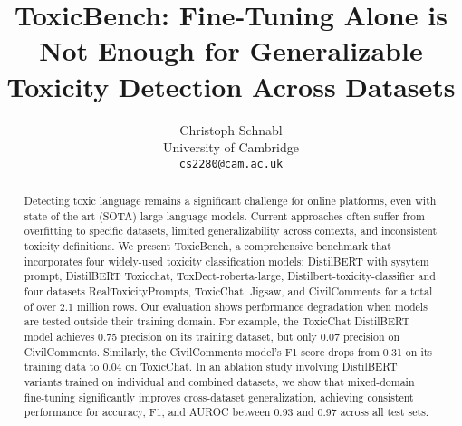 \documentclass{article}
\title{ToxicBench: Fine-Tuning Alone is Not Enough for Generalizable Toxicity Detection Across Datasets}
\author{%
  Christoph Schnabl \\
      University of Cambridge \\
  \texttt{cs2280@cam.ac.uk}
}
\begin{document}
\maketitle


\begin{abstract}
Detecting toxic language remains a significant challenge for online platforms, even with state-of-the-art (SOTA) large language models. Current approaches often suffer from overfitting to specific datasets, limited generalizability across contexts, and inconsistent toxicity definitions. We present ToxicBench, a comprehensive benchmark that incorporates four widely-used  toxicity classification models: DistilBERT with sysytem prompt, DistilBERT Toxicchat, ToxDect-roberta-large, Distilbert-toxicity-classifier and four datasets RealToxicityPrompts, ToxicChat, Jigsaw, and CivilComments for a total of over 2.1 million rows.\newline
Our evaluation shows performance degradation when models are tested outside their training domain. For example, the ToxicChat DistilBERT model achieves 0.75 precision on its training dataset, but only 0.07 precision on CivilComments. Similarly, the CivilComments model's F1 score drops from 0.31 on its training data to 0.04 on ToxicChat. In an ablation study involving DistilBERT variants trained on individual and combined datasets, we show that mixed-domain fine-tuning significantly improves cross-dataset generalization, achieving consistent performance for accuracy, F1, and AUROC between 0.93 and 0.97 across all test sets.  

\end{abstract}









\newpage
 
\end{document}
